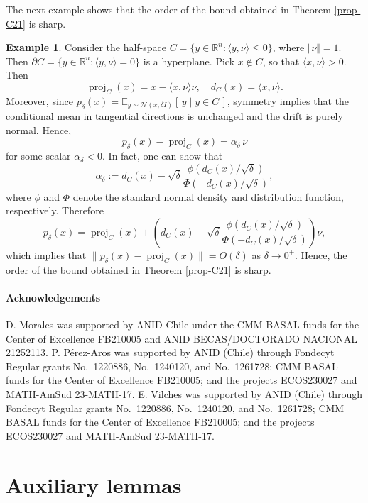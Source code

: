\documentclass[11pt]{amsart}
\newcommand{\1}{\mathds{1}}
\theoremstyle{definition}
\theoremstyle{remark}
\theoremstyle{definition}
\newtheorem{example}{Example}[section]
\begin{document}
The next example shows that the order of the bound obtained in Theorem \ref{prop-C21} is sharp.
\begin{example} Consider the half-space $C=\{y\in \mathbb{R}^n: \langle y, \nu\rangle \leq 0\}$, where $\Vert \nu\Vert=1$. Then $\partial C=\{y\in\mathbb{R}^n: \langle y,\nu\rangle=0\}$ is a hyperplane. Pick $x\notin C$, so that $\langle x,\nu\rangle>0$. Then
$$
\operatorname{proj}_C(x)=x-\langle x,\nu \rangle \nu, \quad d_C(x)=\langle x,\nu\rangle.
$$
Moreover, since $p_{\delta}(x)=\mathbb{E}_{y\sim \mathcal{N}(x,\delta I)}\!\left[\,y \mid y\in C\,\right]$, symmetry implies that the conditional mean in tangential directions is unchanged and the drift is purely normal. Hence, 
$$
p_{\delta}(x)-\operatorname{proj}_C(x)=\alpha_{\delta}\,\nu
$$
for some scalar $\alpha_{\delta}<0$. In fact, one can show that
$$
\alpha_{\delta}:=d_C(x)-\sqrt{\delta}\frac{\phi(d_C(x)/\sqrt{\delta})}{\Phi(-d_C(x)/\sqrt{\delta})},
$$
where $\phi$ and $\Phi$ denote the standard normal density and distribution function, respectively.
Therefore
$$
p_{\delta}(x)=\operatorname{proj}_C(x)+\left(d_C(x)-\sqrt{\delta}\frac{\phi(d_C(x)/\sqrt{\delta})}{\Phi(-d_C(x)/\sqrt{\delta})}\right)\nu,
$$
which implies that $\|p_{\delta}(x)-\operatorname{proj}_C(x)\|=O(\delta)$  as $\delta \to 0^{+}$. Hence, the  order of the bound obtained in Theorem \ref{prop-C21} is sharp.  
\end{example}

\paragraph{Acknowledgements}

D. Morales was supported by ANID Chile under the CMM BASAL funds for the Center of Excellence FB210005 and ANID BECAS/DOCTORADO NACIONAL 21252113. P. P\'erez-Aros was supported by ANID (Chile) through Fondecyt Regular grants No.~1220886, No.~1240120, and No.~1261728; CMM BASAL funds for the Center of Excellence FB210005; and the projects ECOS230027 and MATH-AmSud 23-MATH-17. E. Vilches was supported by ANID (Chile) through Fondecyt Regular grants No.~1220886, No.~1240120, and No.~1261728; CMM BASAL funds for the Center of Excellence FB210005; and the projects ECOS230027 and MATH-AmSud 23-MATH-17.







\appendix
\section{Auxiliary lemmas}
\end{document}
